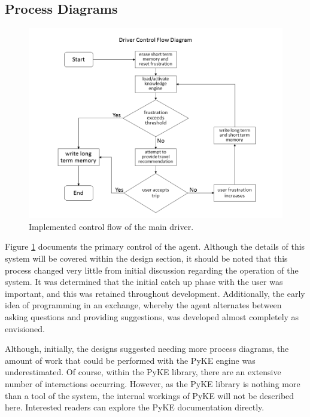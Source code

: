 \documentclass[11pt]{article} %
\begin{document}
\subsection{Process Diagrams}
\begin{figure}[!htb]
\centering
\includegraphics[width=12cm]{driver_control_flow.png}
\caption{Implemented control flow of the main driver.\label{fig:driver}}
\end{figure}

Figure \ref{fig:driver} documents the primary control of the agent. Although the details of this system will be covered within the design section, it should be noted that this process changed very little from initial discussion regarding the operation of the system. It was determined that the initial catch up phase with the user was important, and this was retained throughout development. Additionally, the early idea of programming in an exchange, whereby the agent alternates between asking questions and providing suggestions, was developed almost completely as envisioned.

Although, initially, the designs suggested needing more process diagrams, the amount of work that could be performed with the PyKE engine was underestimated. Of course, within the PyKE library, there are an extensive number of interactions occurring. However, as the PyKE library is nothing more than a tool of the system, the internal workings of PyKE will not be described here. Interested readers can explore the PyKE documentation directly\cite{pyke}.
\end{document}
